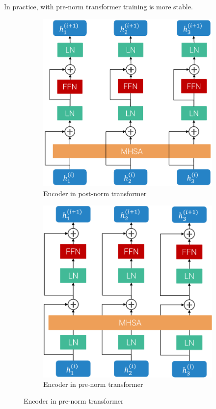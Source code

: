 \begin{description}
\begin{descriptionlist}
                \begin{remark}
                    In practice, with pre-norm transformer training is more stable.
                \end{remark}
        \end{descriptionlist}

        \begin{figure}[H]
            \centering
            \begin{subfigure}{0.40\linewidth}
                \centering
                \includegraphics[width=0.8\linewidth]{./img/_post_norm_encoder.pdf}
                \caption{Encoder in post-norm transformer}
            \end{subfigure}
            \begin{subfigure}{0.40\linewidth}
                \centering
                \includegraphics[width=0.8\linewidth]{./img/_pre_norm_encoder.pdf}
                \caption{Encoder in pre-norm transformer}
            \end{subfigure}
        \end{figure}



\end{description}
